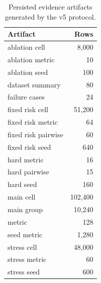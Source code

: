 \begin{table}[t]
\centering
\caption{Persisted evidence artifacts generated by the v5 protocol.}
\label{tab:row-counts}
\begin{tabular}{lr}
\toprule
Artifact & Rows \\
\midrule
ablation cell & 8,000 \\
ablation metric & 10 \\
ablation seed & 100 \\
dataset summary & 80 \\
failure cases & 24 \\
fixed risk cell & 51,200 \\
fixed risk metric & 64 \\
fixed risk pairwise & 60 \\
fixed risk seed & 640 \\
hard metric & 16 \\
hard pairwise & 15 \\
hard seed & 160 \\
main cell & 102,400 \\
main group & 10,240 \\
metric & 128 \\
seed metric & 1,280 \\
stress cell & 48,000 \\
stress metric & 60 \\
stress seed & 600 \\
\bottomrule
\end{tabular}
\end{table}
